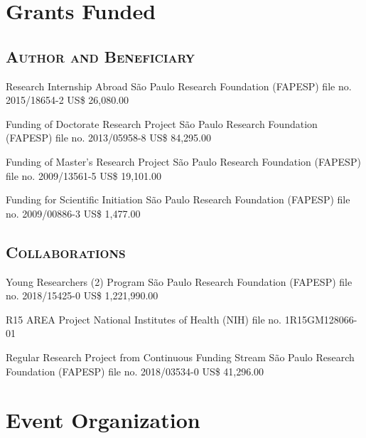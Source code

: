 \documentclass[11pt, letterpaper, sans]{moderncv}
\begin{document}
\section{Grants Funded}

\vspace{.5em}
	\subsection{\textsc{Author and Beneficiary}}
\vspace{.5em}

{Research Internship Abroad}
{São Paulo Research Foundation (FAPESP)}
{file no. 2015/18654-2}
{US\$ 26,080.00}{}

{Funding of Doctorate Research Project}
{São Paulo Research Foundation (FAPESP)}
{file no. 2013/05958-8}
{US\$ 84,295.00}{}

{Funding of Master's Research Project}
{São Paulo Research Foundation (FAPESP)}
{file no. 2009/13561-5}
{US\$ 19,101.00}{}

{Funding for Scientific Initiation}
{São Paulo Research Foundation (FAPESP)}
{file no. 2009/00886-3}
{US\$ 1,477.00}{}

\vspace{.5em}
	\subsection{\textsc{Collaborations}}
\vspace{.5em}

{Young Researchers (2) Program}
{São Paulo Research Foundation (FAPESP)}
{file no. 2018/15425-0}
{US\$ 1,221,990.00}{}

{R15 AREA Project}
{National Institutes of Health (NIH)}
{file no. 1R15GM128066-01}
{}{}

{Regular Research Project from Continuous Funding Stream}
{São Paulo Research Foundation (FAPESP)}
{file no. 2018/03534-0}
{US\$ 41,296.00}{}



\section{Event Organization}
\end{document}
